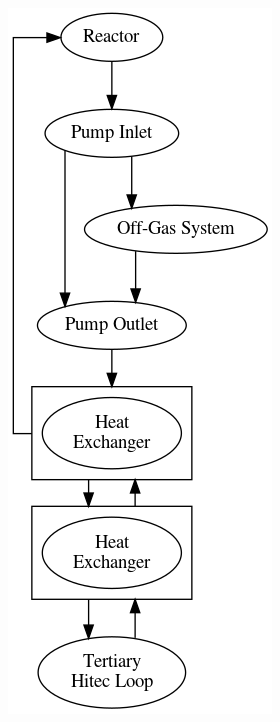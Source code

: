 \documentclass[letterpaper]{article}
\begin{document}
\begin{figure}[H]
  \centering
  \includegraphics[height=.5\textheight]{figures/msdr-overview.png}
  \label{fig:figE}
  

\end{figure}
\end{document}
